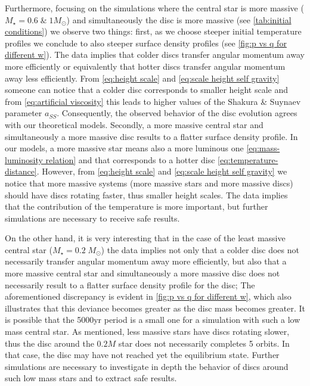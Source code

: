 \documentclass[aps,prb,twocolumn,superscriptaddress,floatfix,longbibliography]{revtex4-2}
\newcounter{para}
\begin{document}
Furthermore, focusing on the simulations where the central star is more massive ($M_{\star} = 0.6 \; \& \; 1 M_{\odot}$) and simultaneously the disc is more massive (see \cref{tab:initial conditions}) we observe two things: first, as we choose steeper initial temperature profiles we conclude to also steeper surface density profiles (see \cref{fig:p vs q for different w}). The data implies that colder discs transfer angular momentum away more efficiently or equivalently that hotter discs transfer angular momentum away less efficiently. From \eqref{eq:height scale} and \eqref{eq:scale height self gravity} someone can notice that a colder disc corresponds to smaller height scale and from \eqref{eq:artificial viscosity} this leads to higher values of the Shakura \& Suynaev parameter $a_{SS}$. Consequently, the observed behavior of the disc evolution agrees with our theoretical models. Secondly, a more massive central star and simultaneously a more massive disc results to a flatter surface density profile. In our models, a more massive star means also a more luminous one \eqref{eq:mass-luminosity relation} and that corresponds to a hotter disc \eqref{eq:temperature-distance}. However, from \eqref{eq:height scale} and \eqref{eq:scale height self gravity} we notice that more massive systems (more massive stars and more massive discs) should have discs rotating faster, thus smaller height scales. The data implies that the contribution of the temperature is more important, but further simulations are necessary to receive safe results.

On the other hand, it is very interesting that in the case of the least massive central star ($M_{\star} = 0.2 \;  M_{\odot}$) the data implies not only that a colder disc does not necessarily transfer angular momentum away more efficiently, but also that a more massive central star and simultaneously a more massive disc does not necessarily result to a flatter surface density profile for the disc; The aforementioned discrepancy is evident in \cref{fig:p vs q for different w}, which also illustrates that this deviance becomes greater as the disc mass becomes greater.  It is possible that the 5000yr period is a small one for a simulation with such a low mass central star. As mentioned, less massive stars have discs rotating  slower, thus the disc around the $0.2M$ star does not necessarily completes  5  orbits. In that case, the disc may have not reached yet the equilibrium state. Further simulations are necessary to investigate in depth the behavior of discs around such low mass stars and to extract safe results.
\end{document}
